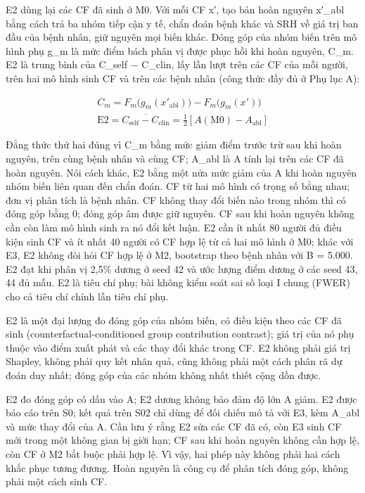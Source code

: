 \documentclass[9pt,a4paper]{extarticle}
\begin{document}
E2 dùng lại các CF đã sinh ở M0. Với mỗi CF x′, tạo bản hoàn nguyên
x′\_abl bằng cách trả ba nhóm tiếp cận y tế, chẩn đoán bệnh khác và SRH
về giá trị ban đầu của bệnh nhân, giữ nguyên mọi biến khác. Đóng góp của
nhóm biến trên mô hình phụ g\_m là mức điểm bách phân vị được phục hồi
khi hoàn nguyên, C\_m. E2 là trung bình của C\_self − C\_clin, lấy lần
lượt trên các CF của mỗi người, trên hai mô hình sinh CF và trên các
bệnh nhân (công thức đầy đủ ở Phụ lục A):

\begin{gather*}
C_m = F_m\big(g_m(x'_{\mathrm{abl}})\big) - F_m\big(g_m(x')\big) \\[3pt]
\mathrm{E2} = \overline{C_{\mathrm{self}} - C_{\mathrm{clin}}} = \tfrac{1}{2}\left[ A(\mathrm{M0}) - A_{\mathrm{abl}} \right]
\end{gather*}

Đẳng thức thứ hai đúng vì C\_m bằng mức giảm điểm trước trừ sau khi hoàn
nguyên, trên cùng bệnh nhân và cùng CF; A\_abl là A tính lại trên các CF
đã hoàn nguyên. Nói cách khác, E2 bằng một nửa mức giảm của A khi hoàn
nguyên nhóm biến liên quan đến chẩn đoán. CF từ hai mô hình có trọng số
bằng nhau; đơn vị phân tích là bệnh nhân. CF không thay đổi biến nào
trong nhóm thì có đóng góp bằng 0; đóng góp âm được giữ nguyên. CF sau
khi hoàn nguyên không cần còn làm mô hình sinh ra nó đổi kết luận. E2
cần ít nhất 80 người đủ điều kiện sinh CF và ít nhất 40 người có CF hợp
lệ từ cả hai mô hình ở M0; khác với E3, E2 không đòi hỏi CF hợp lệ ở M2,
bootstrap theo bệnh nhân với B = 5.000. E2 đạt khi phân vị 2,5\% dương ở
seed 42 và ước lượng điểm dương ở các seed 43, 44 đủ mẫu. E2 là tiêu chí
phụ; bài không kiểm soát sai số loại I chung (FWER) cho cả tiêu chí
chính lẫn tiêu chí phụ.

E2 là một đại lượng đo đóng góp của nhóm biến, có điều kiện theo các CF
đã sinh (counterfactual-conditioned group contribution contrast); giá
trị của nó phụ thuộc vào điểm xuất phát và các thay đổi khác trong CF.
E2 không phải giá trị Shapley, không phải quy kết nhân quả, cũng không
phải một cách phân rã dự đoán duy nhất; đóng góp của các nhóm không nhất
thiết cộng dồn được.

E2 đo đóng góp có dấu vào A; E2 dương không bảo đảm độ lớn
\textbar A\textbar{} giảm. E2 được báo cáo trên S0; kết quả trên S02 chỉ
dùng để đối chiếu mô tả với E3, kèm A\_abl và mức thay đổi của
\textbar A\textbar. Cần lưu ý rằng E2 sửa các CF đã có, còn E3 sinh CF
mới trong một không gian bị giới hạn; CF sau khi hoàn nguyên không cần
hợp lệ, còn CF ở M2 bắt buộc phải hợp lệ. Vì vậy, hai phép này không
phải hai cách khắc phục tương đương. Hoàn nguyên là công cụ để phân tích
đóng góp, không phải một cách sinh CF.
\end{document}
